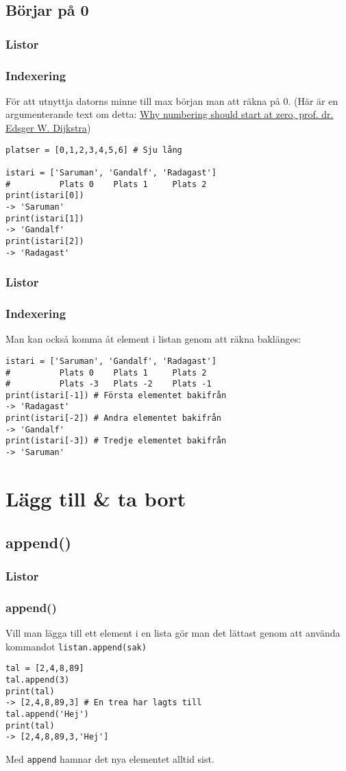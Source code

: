 \documentclass{beamer}
\newcommand{\code}[1]{\colorbox{white}{\lstinline{#1}}}
\begin{document}
\subsection{Börjar på 0}

\begin{frame}[fragile]
\frametitle{Listor}
\frametitle{Indexering}

För att utnyttja datorns minne till max början man att räkna på 0. (Här är en argumenterande text om detta: \href{https://www.cs.utexas.edu/users/EWD/ewd08xx/EWD831.PDF}{Why numbering should start at zero,  prof. dr. Edsger W. Dijkstra})

\begin{lstlisting}
platser = [0,1,2,3,4,5,6] # Sju lång

istari = ['Saruman', 'Gandalf', 'Radagast']
#          Plats 0    Plats 1     Plats 2
print(istari[0])
-> 'Saruman'
print(istari[1])
-> 'Gandalf'
print(istari[2])
-> 'Radagast'
\end{lstlisting}

\end{frame}

\begin{frame}[fragile]
\frametitle{Listor}
\frametitle{Indexering}

Man kan också komma åt element i listan genom att räkna baklänges:

\begin{lstlisting}
istari = ['Saruman', 'Gandalf', 'Radagast']
#          Plats 0    Plats 1     Plats 2
#          Plats -3   Plats -2    Plats -1
print(istari[-1]) # Första elementet bakifrån
-> 'Radagast'
print(istari[-2]) # Andra elementet bakifrån
-> 'Gandalf'
print(istari[-3]) # Tredje elementet bakifrån
-> 'Saruman'
\end{lstlisting}

\end{frame}

\section{Lägg till \& ta bort}

\subsection{append()}

\begin{frame}[fragile]
\frametitle{Listor}
\frametitle{append()}

Vill man lägga till ett element i en lista gör man det lättast genom att använda kommandot \code{listan.append(sak)}

\begin{lstlisting}
tal = [2,4,8,89]
tal.append(3)
print(tal)
-> [2,4,8,89,3] # En trea har lagts till
tal.append('Hej')
print(tal)
-> [2,4,8,89,3,'Hej']
\end{lstlisting}

Med \code{append} hamnar det nya elementet alltid sist.

\end{frame}
\end{document}
